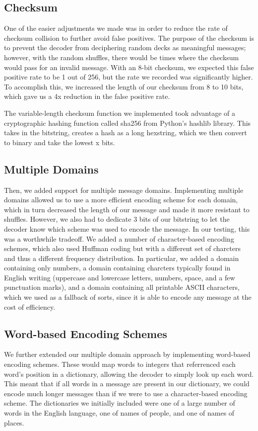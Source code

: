 \documentclass{article}
\begin{document}
\subsection{Checksum}
One of the easier adjustments we made was in order to reduce the rate of checksum collision to further avoid false positives. The purpose of the checksum is to prevent the decoder from deciphering random decks as meaningful messages; however, with the random shuffles, there would be times where the checksum would pass for an invalid message. With an 8-bit checksum, we expected this false positive rate to be 1 out of 256, but the rate we recorded was significantly higher. To accomplish this, we increased the length of our checksum from 8 to 10 bits, which gave us a 4x reduction in the false positive rate.

The variable-length checksum function we implemented took advantage of a cryptographic hashing function called sha256 from Python's hashlib library. This takes in the bitstring, creates a hash as a long hexstring, which we then convert to binary and take the lowest x bits. 

\subsection{Multiple Domains}
Then, we added support for multiple message domains. Implementing multiple domains allowed us to use a more efficient encoding scheme for each domain, which in turn decreased the length of our message and made it more resistant to shuffles. However, we also had to dedicate 3 bits of our bitstring to let the decoder know which scheme was used to encode the message. In our testing, this was a worthwhile tradeoff. We added a number of character-based encoding schemes, which also used Huffman coding but with a different set of charcters and thus a different frequency distribution. In particular, we added a domain containing only numbers, a domain containing charcters typically found in English writing (uppercase and lowercase letters, numbers, space, and a few punctuation marks), and a domain containing all printable ASCII characters, which we used as a fallback of sorts, since it is able to encode any message at the cost of efficiency.

\subsection{Word-based Encoding Schemes}
We further extended our multiple domain approach by implementing word-based encoding schemes. These would map words to integers that referrenced each word's position in a dictionary, allowing the decoder to simply look up each word. This meant that if all words in a message are present in our dictionary, we could encode much longer messages than if we were to use a character-based encoding scheme. The dictionaries we initially included were one of a large number of words in the English language, one of names of people, and one of names of places.
\end{document}
